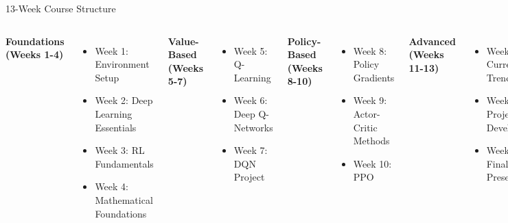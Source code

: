 \documentclass[aspectratio=169,10pt]{beamer}
\begin{document}
\begin{frame}{13-Week Course Structure}
\begin{columns}
\textbf{Foundations (Weeks 1-4)}
\begin{itemize}
    \item Week 1: Environment Setup
    \item Week 2: Deep Learning Essentials
    \item Week 3: RL Fundamentals
    \item Week 4: Mathematical Foundations
\end{itemize}

\textbf{Value-Based (Weeks 5-7)}
\begin{itemize}
    \item Week 5: Q-Learning
    \item Week 6: Deep Q-Networks
    \item Week 7: DQN Project
\end{itemize}

\textbf{Policy-Based (Weeks 8-10)}
\begin{itemize}
    \item Week 8: Policy Gradients
    \item Week 9: Actor-Critic Methods
    \item Week 10: PPO
\end{itemize}

\textbf{Advanced (Weeks 11-13)}
\begin{itemize}
    \item Week 11: Current Trends
    \item Week 12: Project Development
    \item Week 13: Final Presentations
\end{itemize}
\end{columns}
\end{frame}
\end{document}
